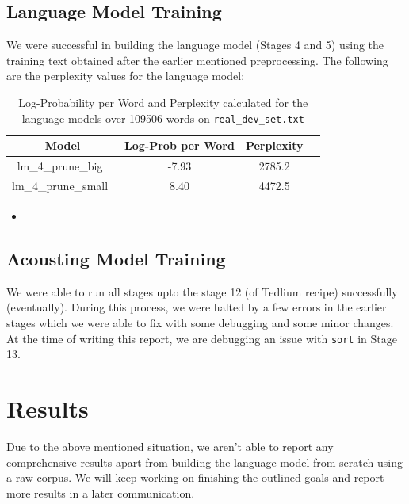 \documentclass[11pt]{article} \usepackage{spconf,amsmath,graphicx}
\begin{document}
\subsection{Language Model Training}
We were successful in building the language model (Stages 4 and 5) using the training text obtained after the earlier mentioned preprocessing.
The following are the perplexity values for the language model:
\begin{table}[h]
\begin{center}
\begin{tabular}[width=5cm]{ |c|c|c|c| } 
\hline Model & Log-Prob per Word & Perplexity\\ \hline
lm\_4\_prune\_big~\cite{prunebig} &  -7.93  & 2785.2\\ \hline
lm\_4\_prune\_small~\cite{prunesmall} &   8.40  & 4472.5\\ \hline





\end{tabular}

\caption{Log-Probability per Word and Perplexity calculated for the language models over 109506 words on \texttt{real\_dev\_set.txt}}
\label{tab:resultslangmodel} \end{center} \end{table}
\begin{itemize}
	\item 
\end{itemize}

\subsection{Acousting Model Training}
We were able to run all stages upto the stage 12 (of Tedlium recipe) successfully (eventually).  During this process, we  were halted by a few errors in the earlier stages
which we were able to fix with some debugging and some minor changes. At the time of writing this report, we are debugging an issue with \texttt{sort} in Stage 13.

\section{Results}
Due to the above mentioned situation, we aren't able to report any comprehensive results apart from building the language model from scratch using a raw corpus.
We will keep working on finishing the outlined goals and report more results in a later communication.
\end{document}
